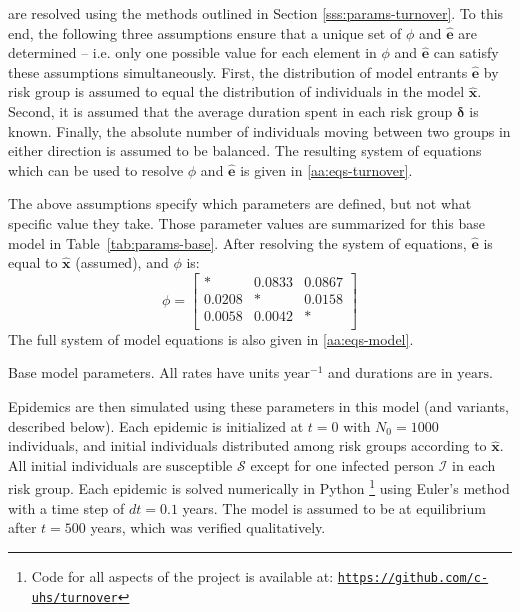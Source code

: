 are resolved using the methods outlined in
Section \ref{sss:params-turnover}. %
To this end, the following three assumptions ensure that
a unique set of $\phi$ and $\bm{\hat{e}}$ are determined
-- i.e. only one possible value for each element in $\phi$ and $\bm{\hat{e}}$
can satisfy these assumptions simultaneously.
First, the distribution of model entrants $\bm{\hat{e}}$ by risk group is assumed to equal
the distribution of individuals in the model $\bm{\hat{x}}$.
Second, it is assumed that
the average duration spent in each risk group $\bm{\delta}$ is known.
Finally, the absolute number of individuals
moving between two groups in either direction is assumed to be balanced.
The resulting system of equations which can be used to resolve $\phi$ and $\bm{\hat{e}}$
is given in \ref{aa:eqs-turnover}. %
\par
The above assumptions specify which parameters are defined,
but not what specific value they take.
Those parameter values are summarized for this base model in Table~\ref{tab:params-base}.
After resolving the system of equations,
$\bm{\hat{e}}$ is equal to $\bm{\hat{x}}$ (assumed),
and $\phi$ is:
\begin{equation}
\phi = \left[\begin{array}{ccc}
*      & 0.0833 & 0.0867 \\
0.0208 & *      & 0.0158 \\
0.0058 & 0.0042 & *      \\
\end{array}\right]
\end{equation}
The full system of model equations is also given in \ref{aa:eqs-model}. %
\begin{table}
  \centering
  \caption{Base model parameters.
    All rates have units $\mathrm{year}^{-1}$ and durations are in $\mathrm{years}$.}
  \label{tab:params-base}
  
\end{table}
\par
Epidemics are then simulated using these parameters in this model
(and variants, described below).
Each epidemic is initialized at $t = 0$ with $N_0 = 1000$ individuals,
and initial individuals distributed among risk groups according to $\bm{\hat{x}}$.
All initial individuals are susceptible $\mathcal{S}$
except for one infected person $\mathcal{I}$ in each risk group.
Each epidemic is solved numerically in Python%
\footnote{Code for all aspects of the project is available at:
  \href{https://github.com/c-uhs/turnover}{\texttt{https://github.com/c-uhs/turnover}}}
using Euler's method with a time step of $dt = 0.1$ years.
The model is assumed to be at equilibrium after $t = 500$ years,
which was verified qualitatively. %
